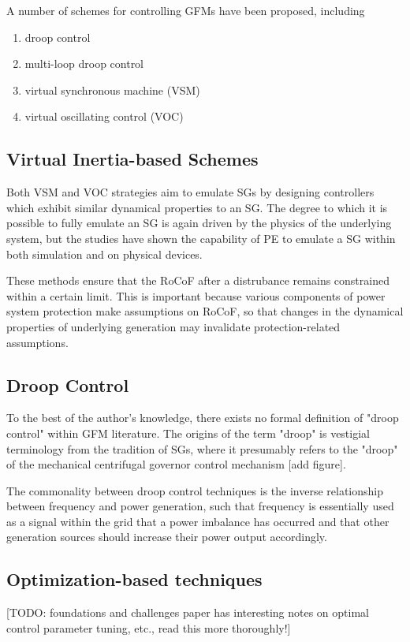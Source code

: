 \documentclass[journal]{IEEEtran}
\begin{document}
A number of schemes for controlling GFMs have been proposed, including
\begin{enumerate}
  \item droop control
  \item multi-loop droop control
  \item virtual synchronous machine (VSM)
  \item virtual oscillating control (VOC)
\end{enumerate}

\subsection{Virtual Inertia-based Schemes}
Both VSM and VOC strategies aim to emulate SGs by designing controllers
which exhibit similar dynamical properties to an SG. The degree
to which it is possible to fully emulate an SG is again driven by 
the physics of the underlying system, but the studies have shown
the capability of PE to emulate a SG within both simulation %
and on physical devices.

These methods ensure that the RoCoF after a distrubance remains constrained
within a certain limit. This is important because various components of
power system protection make assumptions on RoCoF, so that changes
in the dynamical properties of underlying generation may invalidate
protection-related assumptions.


\subsection{Droop Control}
To the best of the author's knowledge, there exists no formal definition
of "droop control" within GFM literature. The origins of the
term "droop" is vestigial terminology from the tradition of SGs, where
it presumably refers to the "droop" of the mechanical centrifugal governor
control mechanism [add figure].

The commonality between droop control techniques is the inverse
relationship between frequency and power generation, such that
frequency is essentially used as a signal within the grid that a power
imbalance has occurred and that other generation sources should
increase their power output accordingly.


\subsection{Optimization-based techniques}
[TODO: foundations and challenges paper has interesting notes on optimal
control parameter tuning, etc., read this more thoroughly!]
\end{document}
